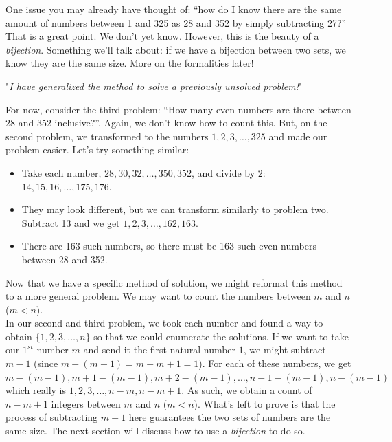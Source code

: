 \documentclass[openany]{book}
\theoremstyle{definition}
\begin{document}
One issue you may already have thought of: ``how do I know there are the same amount of numbers between 1 and 325 as 28 and 352 by simply subtracting 27?'' That is a great point. We don't yet know. However, this is the beauty of a \emph{bijection}. Something we'll talk about: if we have a bijection between two sets, we know they are the same size. More on the formalities later!\\
\begin{center}
    "\emph{I have generalized the method to solve a previously unsolved
problem!}"
\end{center}
For now, consider the third problem: ``How many even numbers are there between 28 and 352 inclusive?''. Again, we don't know how to count this. But, on the second problem, we transformed to the numbers $1,2,3,\dots, 325$ and made our problem easier. Let's try something similar:
\begin{itemize}
    \item Take each number, $28,30,32,\dots,350, 352$, and divide by $2$: $14,15,16,\dots, 175, 176$.
    \item They may look different, but we can transform similarly to problem two. Subtract 13 and we get $1,2,3,\dots, 162, 163$.
    \item There are 163 such numbers, so there must be 163 such even numbers between 28 and 352.
\end{itemize}
Now that we have a specific method of solution, we might reformat this method to a more general problem. We may want to count the numbers between $m$ and $n$ ($m<n$). \\
In our second and third problem, we took each number and found a way to obtain $\{1,2,3,\dots, n\}$ so that we could enumerate the solutions. If we want to take our $1^{st}$ number $m$ and send it the first natural number $1$, we might subtract $m-1$ (since $m-(m-1)=m-m+1=1$). For each of these numbers, we get $m-(m-1),m+1-(m-1), m+2-(m-1),\dots, n-1-(m-1), n-(m-1)$ which really is $1,2,3,\dots, n-m, n-m+1$. As such, we obtain a count of $n-m+1$ integers between $m$ and $n$ ($m<n$). What's left to prove is that the process of subtracting $m-1$ here guarantees the two sets of numbers are the same size. The next section will discuss how to use a \emph{bijection} to do so.
\end{document}
